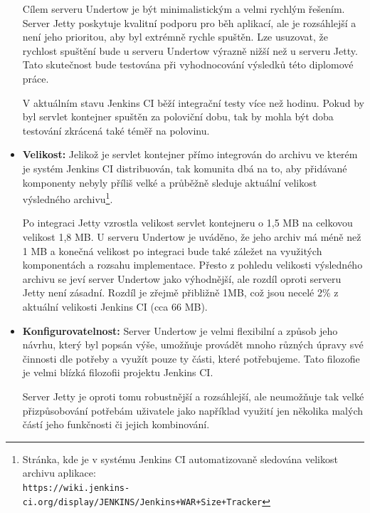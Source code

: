 \begin{itemize}
{                    Cílem serveru Undertow je být minimalistickým a velmi rychlým 
                    řešením. Server Jetty poskytuje kvalitní podporu pro běh aplikací, ale je 
                    rozsáhlejší a není jeho prioritou, aby byl extrémně rychle spuštěn.
                    Lze usuzovat, že rychlost spuštění bude u serveru Undertow výrazně nižší
                    než u serveru Jetty. Tato skutečnost bude testována při vyhodnocování
                    výsledků této diplomové práce.

                    V aktuálním stavu Jenkins CI běží integrační testy více než hodinu. Pokud 
                    by byl servlet kontejner spuštěn za poloviční dobu, tak by mohla být doba testování
                    zkrácená také téměř na polovinu.

                    }

                \item{\textbf{Velikost:} Jelikož je servlet kontejner přímo integrován do archivu ve kterém
                    je systém Jenkins CI distribuován, tak komunita dbá na to, aby přidávané komponenty
                    nebyly příliš velké a průběžně sleduje aktuální velikost
                    výsledného archivu\footnote{Stránka, kde je v systému Jenkins CI automatizovaně
                    sledována velikost archivu aplikace:\\ 
                    \texttt{https://wiki.jenkins-ci.org/display/JENKINS/Jenkins+WAR+Size+Tracker}}.  
                                       
                    Po integraci Jetty vzrostla velikost servlet kontejneru o 1,5 MB na celkovou
                    velikost 1,8 MB. U serveru Undertow je uváděno, že jeho archiv má méně
                    než 1 MB a konečná velikost po integraci bude také záležet na využitých komponentách
                    a rozsahu implementace. Přesto z pohledu velikosti výsledného archivu
                    se jeví server Undertow jako výhodnější, ale rozdíl oproti serveru Jetty není zásadní.
                    Rozdíl je zřejmě přibližně 1MB, což jsou necelé 2\% z aktuální velikosti
                    Jenkins CI (cca 66 MB).}

                \item{\textbf{Konfigurovatelnost:} Server Undertow je velmi flexibilní a způsob
                    jeho návrhu, který byl popsán výše, umožňuje provádět mnoho různých úpravy 
                    své činnosti dle potřeby a využít pouze ty části, které potřebujeme.
                    Tato filozofie je velmi blízká filozofii projektu Jenkins CI. 
                    
                    Server Jetty
                    je oproti tomu robustnější a rozsáhlejší, ale neumožňuje tak velké přizpůsobování potřebám
                    uživatele jako například využití jen několika malých částí jeho funkčnosti či jejich
                    kombinování. }
            \end{itemize}
        


